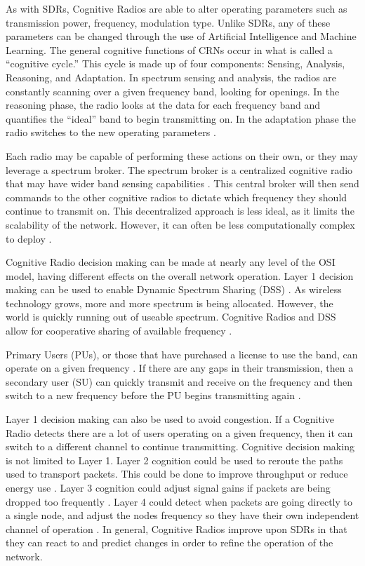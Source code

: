As with SDRs, Cognitive Radios are able to alter operating parameters such as transmission power, frequency, modulation type. Unlike SDRs, any of these parameters can be changed through the use of Artificial Intelligence and Machine Learning. The general cognitive functions of CRNs occur in what is called a ``cognitive cycle.'' \cite{5639025} This cycle is made up of four components: Sensing, Analysis, Reasoning, and Adaptation. In spectrum sensing and analysis, the radios are constantly scanning over a given frequency band, looking for openings. In the reasoning phase, the radio looks at the data for each frequency band and quantifies the ``ideal'' band to begin transmitting on. In the adaptation phase the radio switches to the new operating parameters \cite{5639025}. 

Each radio may be capable of performing these actions on their own, or they may leverage a spectrum broker. The spectrum broker is a centralized cognitive radio that may have wider band sensing capabilities \cite{5639025}. This central broker will then send commands to the other cognitive radios to dictate which frequency they should continue to transmit on. This decentralized approach is less ideal, as it limits the scalability of the network. However, it can often be less computationally complex to deploy \cite{5639025}. 

Cognitive Radio decision making can be made at nearly any level of the OSI model, having different effects on the overall network operation. Layer 1 decision making can be used to enable Dynamic Spectrum Sharing (DSS) \cite{5771952}. As wireless technology grows, more and more spectrum is being allocated. However, the world is quickly running out of useable spectrum. Cognitive Radios and DSS allow for cooperative sharing of available frequency \cite{5771952}. 

Primary Users (PUs), or those that have purchased a license to use the band, can operate on a given frequency \cite{4562561}. If there are any gaps in their transmission, then a secondary user (SU) can quickly transmit and receive on the frequency and then switch to a new frequency before the PU begins transmitting again \cite{4562561}. 

Layer 1 decision making can also be used to avoid congestion. If a Cognitive Radio detects there are a lot of users operating on a given frequency, then it can switch to a different channel to continue transmitting.\cite{Akyildiz2007921} Cognitive decision making is not limited to Layer 1. Layer 2 cognition could be used to reroute the paths used to transport packets. This could be done to improve throughput or reduce energy use \cite{6527405}. Layer 3 cognition could adjust signal gains if packets are being dropped too frequently \cite{6072038}. Layer 4 could detect when packets are going directly to a single node, and adjust the nodes frequency so they have their own independent channel of operation \cite{5062176}. In general, Cognitive Radios improve upon SDRs in that they can react to and predict changes in order to refine the operation of the network. 

